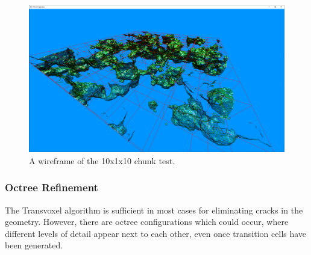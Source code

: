 \documentclass[11pt]{article}
\begin{document}
\begin{figure}[H]
  \includegraphics[width=\textwidth]{10x10_wireframe.png}
  \caption{A wireframe of the 10x1x10 chunk test.}
\end{figure}


\subsubsection{Octree Refinement}
\label{section:octree_refinement}
The Transvoxel algorithm is sufficient in most cases for eliminating cracks in the geometry. However, there are octree configurations which could occur, where different levels of detail appear next to each other, even once transition cells have been generated.
\end{document}
